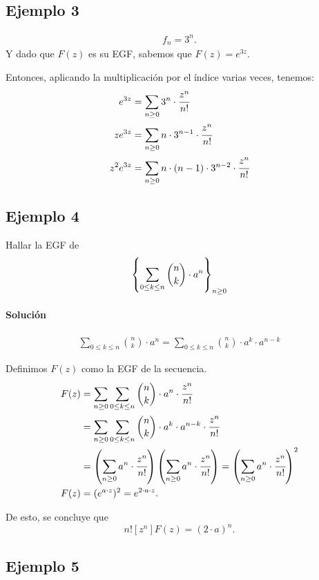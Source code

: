 \subsection{Ejemplo 3}

\begin{align*}
f_n=3^n.
\end{align*}
Y dado que $F(z)$ es su EGF, sabemos que $F(z)=e^{3z}$.

Entonces, aplicando la multiplicación por el índice varias veces, tenemos:
\begin{align*}
e^{3z}&=\sum_{n\geq0}{3^n\cdot\cfrac{z^{n}}{n!}}\\
ze^{3z}&=\sum_{n\geq0}{n\cdot 3^{n-1}\cdot\cfrac{z^{n}}{n!}}\\
z^2e^{3z}&=\sum_{n\geq0}{n\cdot (n-1)\cdot3^{n-2}\cdot\cfrac{z^{n}}{n!}}\\
\end{align*}

\subsection{Ejemplo 4}

Hallar la EGF de
\begin{align*}
\left\{\sum_{0\leq k\leq n}{\binom{n}{k}\cdot a^{n}}\right\}_{n\geq0}
\end{align*}

\paragraph{Solución}
\begin{align*}
\sum_{0\leq k\leq n}{\binom{n}{k}\cdot a^{n}}=\sum_{0\leq k\leq n}{\binom{n}{k}\cdot a^{k}\cdot a^{n-k}}
\end{align*}

Definimos $F(z)$ como la EGF de la secuencia.
\begin{align*}
F(z)&=\sum_{n\geq0}{\sum_{0\leq k\leq n}{\binom{n}{k}\cdot a^{n}}\cdot\cfrac{z^{n}}{n!}}\\
&=\sum_{n\geq0}{\sum_{0\leq k\leq n}{\binom{n}{k}\cdot a^{k}\cdot a^{n-k}}\cdot\cfrac{z^{n}}{n!}}\\
&=\left(\sum_{n\geq0}a^n\cdot\cfrac{z^{n}}{n!}\right)\left(\sum_{n\geq0}a^n\cdot\cfrac{z^{n}}{n!}\right)=\left(\sum_{n\geq0}a^n\cdot\cfrac{z^{n}}{n!}\right)^2\\
F(z)&=(e^{a\cdot z})^2=e^{2\cdot a\cdot z}.
\end{align*}

De esto, se concluye que $$n![z^n]F(z)=(2\cdot a)^n.$$

\subsection{Ejemplo 5}


